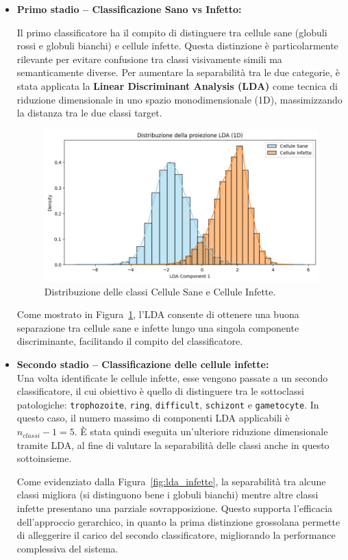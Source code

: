 \documentclass[minted, draw]{../tex/hebdomon}
\begin{document}
\begin{itemize}

\item \textbf{Primo stadio – Classificazione Sano vs Infetto:} \

Il primo classificatore ha il compito di distinguere tra cellule sane (globuli rossi e globuli bianchi) e cellule infette. Questa distinzione è particolarmente rilevante per evitare confusione tra classi visivamente simili ma semanticamente diverse. Per aumentare la separabilità tra le due categorie, è stata applicata la \textbf{Linear Discriminant Analysis (LDA)} come tecnica di riduzione dimensionale in uno spazio monodimensionale (1D), massimizzando la distanza tra le due classi target.

% 
\begin{figure}[H]
  \centering
  \includegraphics[width=.7\linewidth]{figures/lda_1.png}
  \caption{Distribuzione delle classi Cellule Sane e Cellule Infette.}
  \label{fig:lda_sano_infetto}
\end{figure}
%

Come mostrato in Figura~\ref{fig:lda_sano_infetto}, l’LDA consente di ottenere una buona separazione tra cellule sane e infette lungo una singola componente discriminante, facilitando il compito del classificatore.

\item \textbf{Secondo stadio – Classificazione delle cellule infette:} \\
Una volta identificate le cellule infette, esse vengono passate a un secondo classificatore, il cui obiettivo è quello di distinguere tra le sottoclassi patologiche: \texttt{trophozoite}, \texttt{ring}, \texttt{difficult}, \texttt{schizont} e \texttt{gametocyte}. In questo caso, il numero massimo di componenti LDA applicabili è $n_{classi} - 1 = 5$. È stata quindi eseguita un’ulteriore riduzione dimensionale tramite LDA, al fine di valutare la separabilità delle classi anche in questo sottoinsieme.




Come evidenziato dalla Figura~\ref{fig:lda_infette}, la separabilità tra alcune classi migliora (si distinguono bene i globuli bianchi) mentre altre classi infette presentano una parziale sovrapposizione. Questo supporta l’efficacia dell’approccio gerarchico, in quanto la prima distinzione grossolana permette di alleggerire il carico del secondo classificatore, migliorando la performance complessiva del sistema.

\end{itemize}
\end{document}
